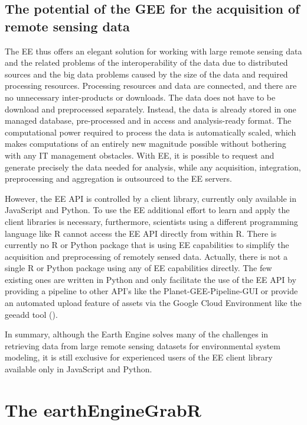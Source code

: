 \subsection{The potential of the GEE for the acquisition of remote sensing data}

The EE thus offers an elegant solution for working with large remote sensing data and the related problems of the interoperability of the data due to distributed sources and the big data problems caused by the size of the data and required processing resources. 
Processing resources and data are connected, and there are no unnecessary inter-products or downloads. 
The data does not have to be download and preprocessed separately. Instead, the data is already stored in one managed database, pre-processed and in access and analysis-ready format. 
The computational power required to process the data is automatically scaled, which makes computations of an entirely new magnitude possible without bothering with any IT management obstacles.
With EE, it is possible to request and generate precisely the data needed for analysis, while any acquisition, integration, preprocessing and aggregation is outsourced to the EE servers. 

However, the EE API is controlled by a client library, currently only available in JavaScript and Python. To use the EE additional effort to learn and apply the client libraries is necessary, furthermore, scientists using a different programming language like R cannot access the EE API directly from within R.
There is currently no R or Python package that is using EE capabilities to simplify the acquisition and preprocessing of remotely sensed data. Actually, there is not a single R or Python package using any of EE capabilities directly. The few existing ones are written in Python and only facilitate the use of the EE API by providing a pipeline to other API's like the Planet-GEE-Pipeline-GUI or provide an automated upload feature of assets via the Google Cloud Environment like the geeadd tool (\cite{roy2017google}).

In summary, although the Earth Engine solves many of the challenges in retrieving data from large remote sensing datasets for environmental system modeling, it is still exclusive for experienced users of the EE client library available only in JavaScript and Python.

\section{The earthEngineGrabR}

